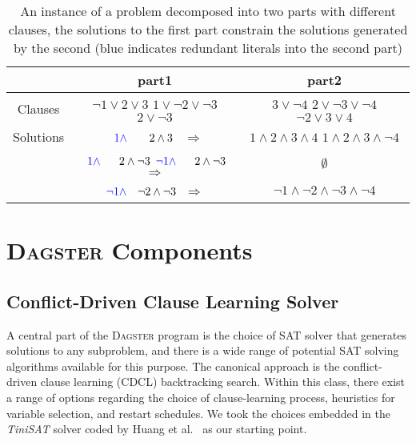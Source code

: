 \documentclass[
10pt, %
a4paper, %
oneside, %
headinclude,footinclude, %
BCOR5mm, %
]{scrartcl}
\begin{document}
\begin{table}[]
\centering

\begin{tabular}{c|c|c|}
\cline{2-3}
                          & part1 & part2 \\ \hline
\multicolumn{1}{|c|}{Clauses} &
\makecell{ $\neg 1 \lor 2 \lor 3 $ \\ $ 1 \lor \neg 2 \lor \neg 3 $ \\ $ 2 \lor \neg 3 $ }
       &
\makecell{ $ 3 \lor \neg 4 $ \\ $ 2 \lor \neg 3 \lor \neg 4 $ \\ $ \neg 2 \lor 3 \lor 4 $ }
       \\ \hline
Solutions                 &  $~~ \textcolor{blue}{1 \land}~~~~~~ 2 \land 3 $ $~~\Rightarrow$    &   
\makecell{ $ 1 \land 2 \land 3 \land 4 $ \\ $ 1 \land 2 \land 3 \land \neg 4 $ }    \\ \cline{3-3} 
                          &  \makecell{ $ ~\textcolor{blue}{1 \land}~~~~~ 2 \land \neg 3 $ \\ $ \textcolor{blue}{\neg 1 \land}~~~~~ 2 \land \neg 3 $  } $\Rightarrow$    &   $\emptyset$    \\ \cline{3-3} 
                          &  $\textcolor{blue}{\neg 1 \land}~~~ \neg 2 \land \neg 3 $  $~\Rightarrow$   &   $ \neg 1 \land \neg 2 \land \neg 3 \land \neg 4 $    \\ \cline{2-3} 
\end{tabular}
\caption[Solving CNF subproblems in sequence]{An instance of a problem decomposed into two parts with different clauses, the solutions to the first part constrain the solutions generated by the second (blue indicates redundant literals into the second part)}
\label{table2}
\end{table}



\section{\textsc{Dagster} Components}

\subsection{Conflict-Driven Clause Learning Solver}\label{sec:CDCL_intro}

A central part of the \textsc{Dagster} program is the choice of SAT solver that generates solutions to any subproblem, and there is a wide range of potential SAT solving algorithms available for this purpose.
The canonical approach is the conflict-driven clause learning (CDCL) backtracking search. Within this class, there exist a range of options regarding the choice of clause-learning process, heuristics for variable selection, and restart schedules.
We took the choices embedded in the \textit{TiniSAT} solver coded by Huang et al.~\cite{DBLP:conf/ijcai/Huang07} as our starting point.
\end{document}
